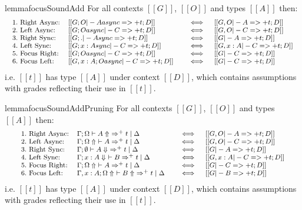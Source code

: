 \begin{restatable}{lemma}{focusSoundAdd}
  \label{lemma:fAddSynthSound}
For all contexts $[[ G ]]$, $[[ O ]]$ and types $[[ A ]]$
then:
\begin{align*}
  {\footnotesize{
\begin{array}{lll}
 1.\ \text{Right Async:} & [[ G ; O |- A async =>+ t ; D ]] \quad &\iff \quad [[ G , O |- A =>+ t ; D ]]\\
 2.\ \text{Left Async:} & [[ G ; O async |- C =>+ t ; D ]] \quad &\iff \quad [[ G , O |- C =>+ t ; D ]]\\
 3.\ \text{Right Sync:} & [[ G ; . |- A sync =>+ t ; D ]] \quad &\iff \quad [[ G |- A =>+ t ; D ]]\\
 4.\ \text{Left Sync:} & [[ G ; {x : A }sync |- C =>+ t ; D ]] \quad &\iff \quad [[ G, x : A |- C =>+ t ; D ]]\\
 5.\ \text{Focus Right:} & [[ G ; O async |- C =>+ t ; D ]] \quad &\iff \quad [[ G |- C =>+ t ; D ]]\\
 6.\ \text{Focus Left:} & [[ G, x : A ; O async |- C =>+ t ; D ]] \quad &\iff \quad [[ G |- C =>+ t ; D ]]
\end{array}
  }}
\end{align*}
i.e. $[[ t ]]$ has type $[[ A ]]$
under context $[[ D ]]$,
which contains assumptions with grades reflecting their use in $[[ t ]]$.
\end{restatable}

\begin{restatable}{lemma}{focusSoundAddPruning}
\label{lemma:fAddPruningSynthSound}
For all contexts $[[ G ]]$, $[[ O ]]$ and types $[[ A ]]$
then:
\begin{align*}
  {\footnotesize{
\begin{array}{lll}
 1.\ \text{Right Async:} & \Gamma ; \Omega \vdash A \Uparrow\ \Rightarrow^{+} t \mid \Delta \quad &\iff \quad [[ G , O |- A =>+ t ; D ]]\\
 2.\ \text{Left Async:} & \Gamma ; \Omega \Uparrow\ \vdash A \Rightarrow^{+} t \mid \Delta \quad &\iff \quad [[ G , O |- C =>+ t ; D ]]\\
 3.\ \text{Right Sync:} & \Gamma ; \emptyset \vdash A \Downarrow\ \Rightarrow^{+} t \mid \Delta  \quad &\iff \quad [[ G |- A =>+ t ; D ]]\\
 4.\ \text{Left Sync:} & \Gamma ; x : A \Downarrow\ \vdash  B \Rightarrow^{+} t \mid \Delta \quad &\iff \quad [[ G, x : A |- C =>+ t ; D ]]\\
 5.\ \text{Focus Right:} & \Gamma ; \Omega \Uparrow\ \vdash A \Rightarrow^{+} t \mid \Delta \quad &\iff \quad [[ G |- C =>+ t ; D ]]\\
 6.\ \text{Focus Left:} & \Gamma, x : A ; \Omega \Uparrow\ \vdash B \Uparrow\ \Rightarrow^{+} t \mid \Delta \quad &\iff \quad [[ G |- B =>+ t ; D ]]
\end{array}
  }}
\end{align*}
i.e. $[[ t ]]$ has type $[[ A ]]$
under context $[[ D ]]$,
which contains assumptions with grades reflecting their use in $[[ t ]]$.
\end{restatable}


